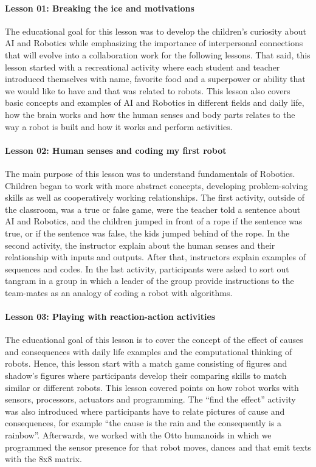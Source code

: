\documentclass[conference]{IEEEtran}
\begin{document}
\paragraph{Lesson 01: Breaking the ice and motivations} 
The educational goal for this lesson was to develop the children’s curiosity about AI and Robotics while emphasizing the importance of interpersonal connections that will evolve into a collaboration work for the following lessons.
That said, this lesson started with a recreational activity where each student and teacher introduced themselves with name, favorite food and a superpower or ability that we would like to have and that was related to robots. 
This lesson also covers basic concepts and examples of AI and Robotics in different fields and daily life, how the brain works and how the human senses and body parts relates to the way a robot is built and how it works and perform activities.

\paragraph{Lesson 02: Human senses and coding my first robot} 
The main purpose of this lesson was to understand fundamentals of Robotics. 
Children began to work with more abstract concepts, developing problem-solving skills as well as cooperatively working relationships. 
The first activity, outside of the classroom, was a true or false game, were the teacher told a sentence about AI and Robotics, and the children jumped in front of a rope if the sentence was true, or if the sentence was false, the kids jumped behind of the rope.
In the second activity, the instructor explain about the human senses and their relationship with inputs and outputs. After that, instructors explain examples of sequences and codes. 
In the last activity, participants were asked to sort out tangram in a group in which a leader of the group provide instructions to the team-mates as an analogy of coding a robot with algorithms.

\paragraph{Lesson 03: Playing with reaction-action activities} 
The educational goal of this lesson is to cover the concept of the effect of causes and consequences with daily life examples and the computational thinking of robots.
Hence, this lesson start with a match game consisting of figures and shadow’s figures where participants develop their comparing skills to match similar or different robots.
This lesson covered points on how robot works with sensors, processors, actuators and programming. 
The “find the effect” activity was also introduced where participants have to relate pictures of cause and consequences, for example “the cause is the rain and the consequently is a rainbow”.
Afterwards, we worked with the Otto humanoids in which we programmed the sensor presence for that robot moves, dances and that emit texts with the 8x8 matrix.
\end{document}
